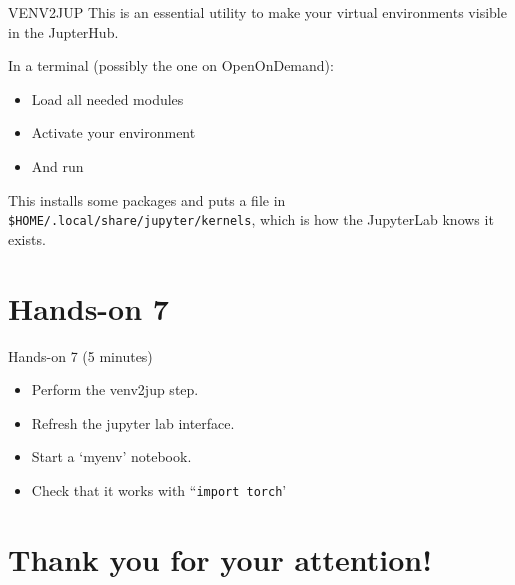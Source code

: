 \documentclass[
  10pt,
  ignorenonframetext,
  aspectratio=169,handout]{beamer}
\newenvironment{Shaded}{\begin{snugshade}}{\end{snugshade}}
\newcommand{\ExtensionTok}[1]{\textcolor[rgb]{0.80,0.80,0.80}{#1}}
\newcommand{\KeywordTok}[1]{\textcolor[rgb]{0.94,0.87,0.69}{#1}}
\newcommand{\NormalTok}[1]{\textcolor[rgb]{0.80,0.80,0.80}{#1}}
\providecommand{\tightlist}{%
  \setlength{\itemsep}{0pt}\setlength{\parskip}{0pt}}
\begin{document}
\begin{frame}[fragile]{VENV2JUP}
\label{venv2jup}
This is an essential utility to make your virtual environments visible in the JupterHub.

In a terminal (possibly the one on OpenOnDemand):

\begin{itemize}
\item
  Load all needed modules

  \pause
\item
  Activate your environment

  \pause
\item
  And run
\end{itemize}

\begin{Shaded}
\end{Shaded}

This installs some packages and puts a file in \texttt{\$HOME/.local/share/jupyter/kernels}, which is how the JupyterLab knows it exists.
\end{frame}

\section{Hands-on 7}\label{hands-on-7}

\begin{frame}[fragile]{Hands-on 7 (5 minutes)}
\label{hands-on-7-5-minutes}
\begin{itemize}
\tightlist
\item
  Perform the venv2jup step.
\item
  Refresh the jupyter lab interface.
\item
  Start a `myenv' notebook.
\item
  Check that it works with ``\texttt{import\ torch}'
\end{itemize}
\end{frame}

\section{Thank you for your attention!}\label{thank-you-for-your-attention}
\end{document}
